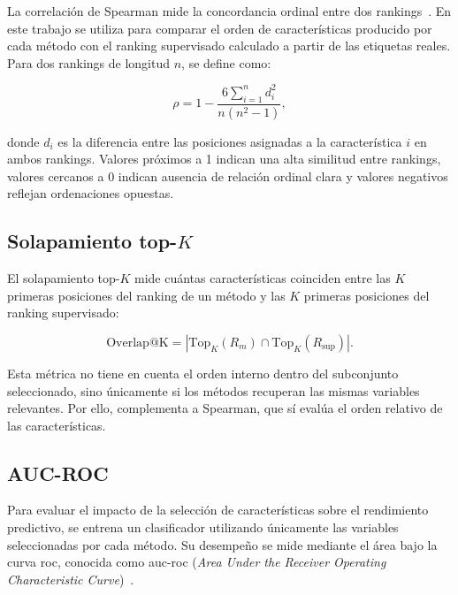 La correlación de Spearman mide la concordancia ordinal entre dos rankings~\cite{spearman1904proof}. En este trabajo se utiliza para comparar el orden de características producido por cada método con el ranking supervisado calculado a partir de las etiquetas reales. Para dos rankings de longitud $n$, se define como:

\begin{equation}
\rho =
1 -
\frac{6\sum_{i=1}^{n} d_i^2}
{n(n^2-1)},
\label{eq:spearman}
\end{equation}

donde $d_i$ es la diferencia entre las posiciones asignadas a la característica $i$ en ambos rankings. Valores próximos a 1 indican una alta similitud entre rankings, valores cercanos a 0 indican ausencia de relación ordinal clara y valores negativos reflejan ordenaciones opuestas.

\subsection{Solapamiento top-$K$}
\label{subsec:overlap}

El solapamiento top-$K$ mide cuántas características coinciden entre las $K$ primeras posiciones del ranking de un método y las $K$ primeras posiciones del ranking supervisado:

\begin{equation}
\mathrm{Overlap@K}
=
\left|
\mathrm{Top}_K(R_m)
\cap
\mathrm{Top}_K(R_{\mathrm{sup}})
\right|.
\label{eq:overlap}
\end{equation}

Esta métrica no tiene en cuenta el orden interno dentro del subconjunto seleccionado, sino únicamente si los métodos recuperan las mismas variables relevantes. Por ello, complementa a Spearman, que sí evalúa el orden relativo de las características.

\subsection{AUC-ROC}
\label{subsec:auc}

Para evaluar el impacto de la selección de características sobre el rendimiento predictivo, se entrena un clasificador utilizando únicamente las variables seleccionadas por cada método. Su desempeño se mide mediante el área bajo la curva \acrshort{roc}, conocida como \acrshort{auc}-\acrshort{roc} (\textit{Area Under the Receiver Operating Characteristic Curve})~\cite{bradley1997use,fawcett2006introduction}.

